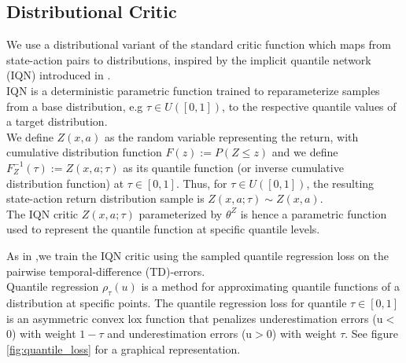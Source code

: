 \subsection{Distributional Critic}
We use a distributional variant of the standard critic function
which maps from state-action pairs to distributions, inspired by the implicit quantile network (IQN) introduced in \cite{Dabney2018b}.\\
IQN is a deterministic parametric function trained to reparameterize samples from a
base distribution, e.g $\tau \in U([0,1])$, to the respective
quantile values of a target distribution.\\
We define $Z(x,a)$ as the random variable representing the return, with cumulative 
distribution function $F(z):=P(Z\leq z)$ and we define $F^{-1}_Z(\tau):=Z(x,a;\tau)$ as its quantile function 
(or inverse cumulative distribution function)
at $\tau \in [0,1]$.
Thus, for $\tau \in U([0,1])$, the resulting state-action return distribution sample is
$Z(x,a;\tau)\sim Z(x,a)$.\\
The IQN critic $Z(x,a;\tau)$ parameterized by $\theta^Z$  is hence a parametric function
used to represent the quantile function at specific quantile levels.

As in \citet{Dabney2018b},we train the IQN critic using the sampled quantile regression
loss \citep{koenker2005} on the pairwise temporal-difference (TD)-errors.\\
Quantile regression $\rho_{\tau}(u)$ is a method for approximating quantile functions of a distribution at specific points.
The quantile regression loss for quantile $\tau \in [0,1]$ is an asymmetric convex lox function
that penalizes underestimation errors (u$<$0) with weight $1-\tau$ and underestimation
errors (u$>$0) with weight $\tau$. See figure \ref{fig:quantile_loss} for a graphical representation. 

